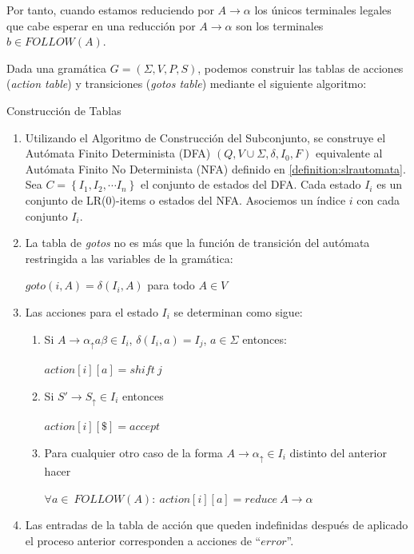 Por tanto, cuando estamos reduciendo por $A \rightarrow \alpha$
los únicos terminales legales que cabe esperar en una reducción por $A \rightarrow \alpha$ son los terminales $b \in FOLLOW(A)$.


Dada una gramática $G=(\Sigma,V,P,S)$, podemos construir las tablas de acciones (\emph{action table}) y  transiciones (\emph{gotos table}) mediante el siguiente algoritmo:

\begin{algorithm} 
\label{alg:tables}       
Construcción de Tablas 

\begin{enumerate}
\item
Utilizando el Algoritmo de Construcción del Subconjunto, se construye
el Autómata Finito Determinista (DFA) $(Q, V \cup \Sigma, \delta, I_0, F)$
equivalente al Autómata Finito No
Determinista (NFA) definido en \ref{definition:slrautomata}.
Sea $C = \left \{ I_1, I_2, \cdots I_n \right \}$ el conjunto de estados
del DFA. Cada estado $I_i$ es un conjunto de LR(0)-items o estados
del NFA. Asociemos un índice $i$ con cada conjunto $I_i$.
\item
La tabla de \emph{gotos} no es más que la función de transición del 
autómata restringida a las variables de la gramática:

\begin{center}
$goto(i,A) = \delta(I_i, A)$ para todo $A \in V$
\end{center}
\item
Las acciones para el estado $I_i$ se determinan como sigue:
  \begin{enumerate}
  \item
  Si $A \rightarrow \alpha _\uparrow a \beta \in I_i$, $\delta(I_i,a) = I_j$, $a \in \Sigma$ 
  entonces:

\begin{center}
  $action[i][a] = shift\ j$
\end{center}
  \item
  Si $S' \rightarrow S_\uparrow \in I_i$ entonces 

\begin{center}
  $action[i][\$] = accept$
\end{center}
  \item
  Para cualquier otro caso de la forma $A \rightarrow \alpha _\uparrow \in I_i$ 
  distinto del anterior hacer

\begin{center}
  $\forall a \in\ FOLLOW(A):\ action[i][a] = reduce\ A \rightarrow \alpha$
\end{center}
  \end{enumerate}
\item
  Las entradas de la tabla de acción que queden indefinidas después de aplicado el proceso anterior corresponden a acciones de ``$error$''.
\end{enumerate}
\end{algorithm}

